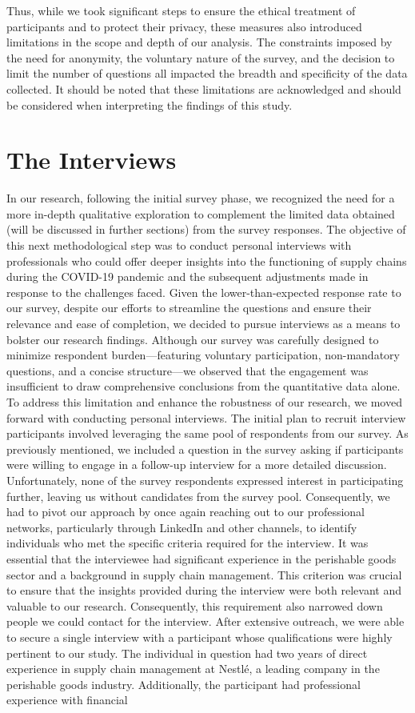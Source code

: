 Thus, while we took significant steps to ensure the ethical treatment of participants and to protect their privacy, these measures also introduced limitations in the scope and depth of our analysis. The constraints imposed by the need for anonymity, the voluntary nature of the survey, and the decision to limit the number of questions all impacted the breadth and specificity of the data collected. It should be noted that these limitations are acknowledged and should be considered when interpreting the findings of this study.

\section{The Interviews}

In our research, following the initial survey phase, we recognized the need for a more in-depth qualitative exploration to complement the limited data obtained (will be discussed in further sections) from the survey responses. The objective of this next methodological step was to conduct personal interviews with professionals who could offer deeper insights into the functioning of supply chains during the COVID-19 pandemic and the subsequent adjustments made in response to the challenges faced. Given the lower-than-expected response rate to our survey, despite our efforts to streamline the questions and ensure their relevance and ease of completion, we decided to pursue interviews as a means to bolster our research findings. Although our survey was carefully designed to minimize respondent burden—featuring voluntary participation, non-mandatory questions, and a concise structure—we observed that the engagement was insufficient to draw comprehensive conclusions from the quantitative data alone. To address this limitation and enhance the robustness of our research, we moved forward with conducting personal interviews. The initial plan to recruit interview participants involved leveraging the same pool of respondents from our survey. As previously mentioned, we included a question in the survey asking if participants were willing to engage in a follow-up interview for a more detailed discussion. Unfortunately, none of the survey respondents expressed interest in participating further, leaving us without candidates from the survey pool. Consequently, we had to pivot our approach by once again reaching out to our professional networks, particularly through LinkedIn and other channels, to identify individuals who met the specific criteria required for the interview. It was essential that the interviewee had significant experience in the perishable goods sector and a background in supply chain management. This criterion was crucial to ensure that the insights provided during the interview were both relevant and valuable to our research. Consequently, this requirement also narrowed down people we could contact for the interview. After extensive outreach, we were able to secure a single interview with a participant whose qualifications were highly pertinent to our study. The individual in question had two years of direct experience in supply chain management at Nestlé, a leading company in the perishable goods industry. Additionally, the participant had professional experience with financial 
